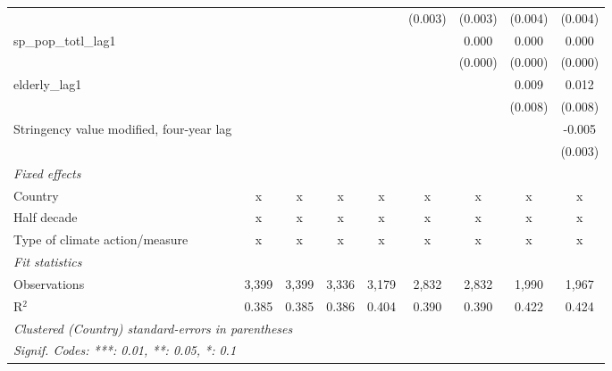 \begin{tabular}{lcccccccc}
                                                                                 &         &         &         &         & (0.003) & (0.003) & (0.004)       & (0.004)\\   
   sp\_pop\_totl\_lag1                                                           &         &         &         &         &         & 0.000   & 0.000         & 0.000\\   
                                                                                 &         &         &         &         &         & (0.000) & (0.000)       & (0.000)\\   
   elderly\_lag1                                                                 &         &         &         &         &         &         & 0.009         & 0.012\\   
                                                                                 &         &         &         &         &         &         & (0.008)       & (0.008)\\   
   Stringency value modified, four-year lag                                      &         &         &         &         &         &         &               & -0.005\\   
                                                                                 &         &         &         &         &         &         &               & (0.003)\\   
   \emph{Fixed effects}\\
   Country                                                                       & x       & x       & x       & x       & x       & x       & x             & x\\  
   Half decade                                                                   & x       & x       & x       & x       & x       & x       & x             & x\\  
   Type of climate action/measure                                                & x       & x       & x       & x       & x       & x       & x             & x\\  
   \midrule \emph{Fit statistics}\\
   Observations                                                                  & 3,399   & 3,399   & 3,336   & 3,179   & 2,832   & 2,832   & 1,990         & 1,967\\  
   R$^2$                                                                         & 0.385   & 0.385   & 0.386   & 0.404   & 0.390   & 0.390   & 0.422         & 0.424\\  
   \midrule
   \multicolumn{9}{l}{\emph{Clustered (Country) standard-errors in parentheses}}\\
   \multicolumn{9}{l}{\emph{Signif. Codes: ***: 0.01, **: 0.05, *: 0.1}}\\
\end{tabular}
\par\endgroup



